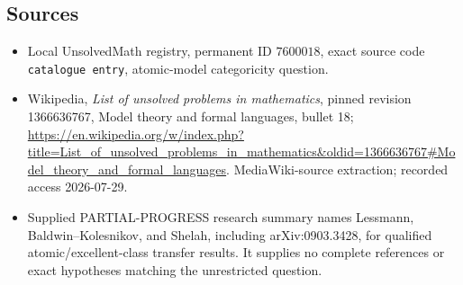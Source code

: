 \documentclass[11pt]{article}
\begin{document}
\subsection{Sources}
\begin{itemize}
\item Local UnsolvedMath registry, permanent ID \(7600018\), exact source code \texttt{catalogue entry}, atomic-model categoricity question.
\item Wikipedia, \emph{List of unsolved problems in mathematics}, pinned revision 1366636767, Model theory and formal languages, bullet 18; \url{https://en.wikipedia.org/w/index.php?title=List_of_unsolved_problems_in_mathematics&oldid=1366636767#Model_theory_and_formal_languages}. MediaWiki-source extraction; recorded access 2026-07-29.
\item Supplied PARTIAL-PROGRESS research summary names Lessmann, Baldwin--Kolesnikov, and Shelah, including arXiv:0903.3428, for qualified atomic/excellent-class transfer results. It supplies no complete references or exact hypotheses matching the unrestricted question.
\end{itemize}
\end{document}
